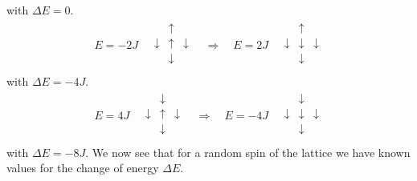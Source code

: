 \documentclass{emulateapj}
\begin{document}
with $\Delta E = 0$.
\begin{align*}
    E = -2J
    \quad
    \begin{matrix}
    & \uparrow & \\
    \downarrow & \uparrow & \downarrow \\
    & \downarrow & \\
    \end{matrix}
    \quad
    \Longrightarrow
    \quad
    E = 2J
    \quad
    \begin{matrix}
    & \uparrow & \\
    \downarrow & \downarrow & \downarrow \\
    & \downarrow & \\
    \end{matrix}
\end{align*}
with $\Delta E = -4J$.
\begin{align*}
    E = 4J
    \quad
    \begin{matrix}
    & \downarrow & \\
    \downarrow & \uparrow & \downarrow \\
    & \downarrow & \\
    \end{matrix}
    \quad
    \Longrightarrow
    \quad
    E = -4J
    \quad
    \begin{matrix}
    & \downarrow & \\
    \downarrow & \downarrow & \downarrow \\
    & \downarrow & \\
    \end{matrix}
\end{align*}
with $\Delta E = -8J$. We now see that for a random spin of the lattice we have known values for the change of energy $\Delta E$. 
\end{document}
